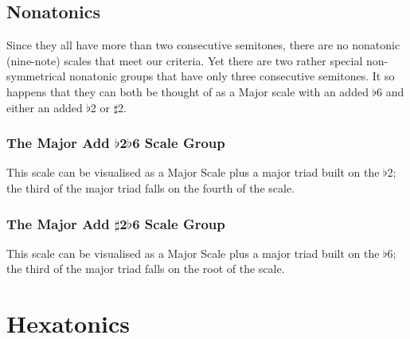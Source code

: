\documentclass[english]{./gbook}
\begin{document}
\begin{large}




\chapter{\mbox{Nonatonics}}

Since they all have more than two consecutive semitones, there are no nonatonic (nine-note) scales that meet our criteria. Yet there are two rather special non-symmetrical nonatonic groups that have only three consecutive semitones. It so happens that they can both be thought of as a Major scale with an added $\flat$6 and either an added $\flat$2 or $\sharp$2.

\section{The Major Add $\flat$2$\flat$6 Scale Group}
This scale can be visualised as a Major Scale plus a major triad built on the $\flat$2; the third of the major triad falls on the fourth of the scale.

\section{The Major Add $\sharp$2$\flat$6 Scale Group}
This scale can be visualised as a Major Scale plus a major triad built on the $\flat$6; the third of the major triad falls on the root of the scale.




\part{Hexatonics}


\end{large}
\end{document}
